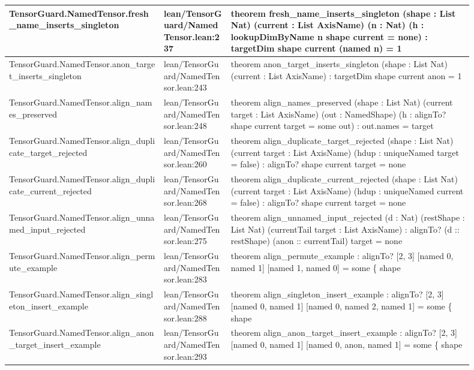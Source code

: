 \documentclass[10pt]{article}
\begin{document}
\begin{longtable}{|p{0.30\linewidth}|p{0.13\linewidth}|p{0.47\linewidth}|}
\hline
TensorGuard.NamedTensor.fresh\_name\_inserts\_singleton & lean/TensorGuard/NamedTensor.lean:237 & theorem fresh\_name\_inserts\_singleton (shape : List Nat) (current : List AxisName) (n : Nat) (h : lookupDimByName n shape current = none) : targetDim shape current (named n) = 1 \\
\hline
TensorGuard.NamedTensor.anon\_target\_inserts\_singleton & lean/TensorGuard/NamedTensor.lean:243 & theorem anon\_target\_inserts\_singleton (shape : List Nat) (current : List AxisName) : targetDim shape current anon = 1 \\
\hline
TensorGuard.NamedTensor.align\_names\_preserved & lean/TensorGuard/NamedTensor.lean:248 & theorem align\_names\_preserved (shape : List Nat) (current target : List AxisName) (out : NamedShape) (h : alignTo? shape current target = some out) : out.names = target \\
\hline
TensorGuard.NamedTensor.align\_duplicate\_target\_rejected & lean/TensorGuard/NamedTensor.lean:260 & theorem align\_duplicate\_target\_rejected (shape : List Nat) (current target : List AxisName) (hdup : uniqueNamed target = false) : alignTo? shape current target = none \\
\hline
TensorGuard.NamedTensor.align\_duplicate\_current\_rejected & lean/TensorGuard/NamedTensor.lean:268 & theorem align\_duplicate\_current\_rejected (shape : List Nat) (current target : List AxisName) (hdup : uniqueNamed current = false) : alignTo? shape current target = none \\
\hline
TensorGuard.NamedTensor.align\_unnamed\_input\_rejected & lean/TensorGuard/NamedTensor.lean:275 & theorem align\_unnamed\_input\_rejected (d : Nat) (restShape : List Nat) (currentTail target : List AxisName) : alignTo? (d :: restShape) (anon :: currentTail) target = none \\
\hline
TensorGuard.NamedTensor.align\_permute\_example & lean/TensorGuard/NamedTensor.lean:283 & theorem align\_permute\_example : alignTo? [2, 3] [named 0, named 1] [named 1, named 0] = some \{ shape \\
\hline
TensorGuard.NamedTensor.align\_singleton\_insert\_example & lean/TensorGuard/NamedTensor.lean:288 & theorem align\_singleton\_insert\_example : alignTo? [2, 3] [named 0, named 1] [named 0, named 2, named 1] = some \{ shape \\
\hline
TensorGuard.NamedTensor.align\_anon\_target\_insert\_example & lean/TensorGuard/NamedTensor.lean:293 & theorem align\_anon\_target\_insert\_example : alignTo? [2, 3] [named 0, named 1] [named 0, anon, named 1] = some \{ shape \\

\end{longtable}
\end{document}
